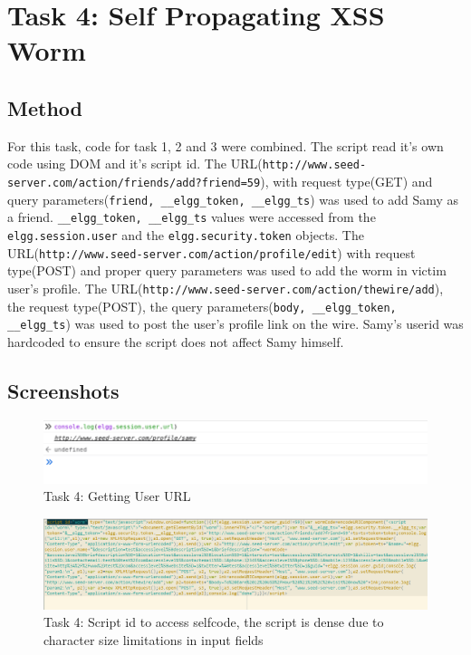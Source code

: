 \documentclass[a4paper, 11pt, oneside]{article} %
\begin{document}
\section{Task 4: Self Propagating XSS Worm}
\subsection{Method}
For this task, code for task 1, 2 and 3 were combined. The script read it's own code using DOM and it's script id. The URL(\texttt{http://www.seed-server.com/action/friends/add?friend=59}), with request type(GET) and query parameters(\texttt{friend, \_\_elgg\_token, \_\_elgg\_ts}) was used to add Samy as a friend. \texttt{\_\_elgg\_token, \_\_elgg\_ts} values were accessed from the \texttt{elgg.session.user} and the \texttt{elgg.security.token} objects. The URL(\texttt{http://www.seed-server.com/action/profile/edit}) with request type(POST) and proper query parameters was used to add the worm in victim user's profile.  The URL(\texttt{http://www.seed-server.com/action/thewire/add}), the request type(POST), the query parameters(\texttt{body, \_\_elgg\_token, \_\_elgg\_ts}) was used to post the user's profile link on the wire. Samy's userid was hardcoded to ensure the script does not affect Samy himself.
\subsection{Screenshots}
\begin{figure}[H]
    \includegraphics[width = 0.95\linewidth, center]{img/task4/4a.png}
    \caption{Task 4: Getting User URL}
    \label{fig:task4a}
\end{figure}
\begin{figure}[H]
    \includegraphics[width = 0.95\linewidth, center]{img/task4/4b.png}
    \caption{Task 4: Script id to access selfcode, the script is dense due to character size limitations in input fields}
    \label{fig:task4b}
\end{figure}
\end{document}
